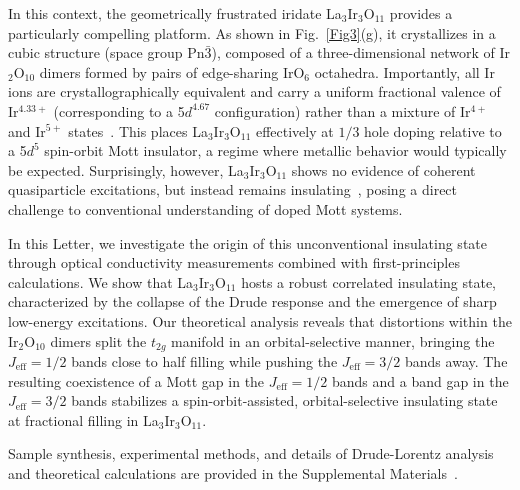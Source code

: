 \documentclass[prl,floatfix,twocolumn,superscriptaddress]{revtex4-2}
\newcommand{\LIO}{La$_3$Ir$_{3}$O$_{11}$}
\begin{document}
In this context, the geometrically frustrated iridate La$_3$Ir$_3$O$_{11}$ provides a particularly compelling platform. As shown in Fig.~\ref{Fig3}(g), it crystallizes in a cubic structure (space group $\mathrm{Pn}\bar{3}$), composed of a three-dimensional network of Ir$_{2}$O$_{10}$ dimers formed by pairs of edge-sharing IrO$_{6}$ octahedra. Importantly, all Ir ions are crystallographically equivalent and carry a uniform fractional valence of Ir$^{4.33+}$ (corresponding to a 5$d^{4.67}$ configuration) rather than a mixture of Ir$^{4+}$ and Ir$^{5+}$ states~\cite{Yang2019,Aoyama2019,Abraham1982}. This places La$_3$Ir$_3$O$_{11}$ effectively at $1/3$ hole doping relative to a 5$d^{5}$ spin-orbit Mott insulator, a regime where metallic behavior would typically be expected. Surprisingly, however, La$_3$Ir$_3$O$_{11}$ shows no evidence of coherent quasiparticle excitations, but instead remains insulating~\cite{Yang2019}, posing a direct challenge to conventional understanding of doped Mott systems.

In this Letter, we investigate the origin of this unconventional insulating state through optical conductivity measurements combined with first-principles calculations. We show that La$_3$Ir$_3$O$_{11}$ hosts a robust correlated insulating state, characterized by the collapse of the Drude response and the emergence of sharp low-energy excitations. Our theoretical analysis reveals that distortions within the Ir$_2$O$_{10}$ dimers split the $t_{2g}$ manifold in an orbital-selective manner, bringing the $J_{\mathrm{eff}} = 1/2$ bands close to half filling while pushing the $J_{\mathrm{eff}} = 3/2$ bands away. The resulting coexistence of a Mott gap in the $J_{\mathrm{eff}} = 1/2$ bands and a band gap in the $J_{\mathrm{eff}} = 3/2$ bands stabilizes a spin-orbit-assisted, orbital-selective insulating state at fractional filling in \LIO.





Sample synthesis, experimental methods, and details of Drude-Lorentz analysis and theoretical calculations are provided in the Supplemental Materials~\footnotemark[1].
\end{document}
